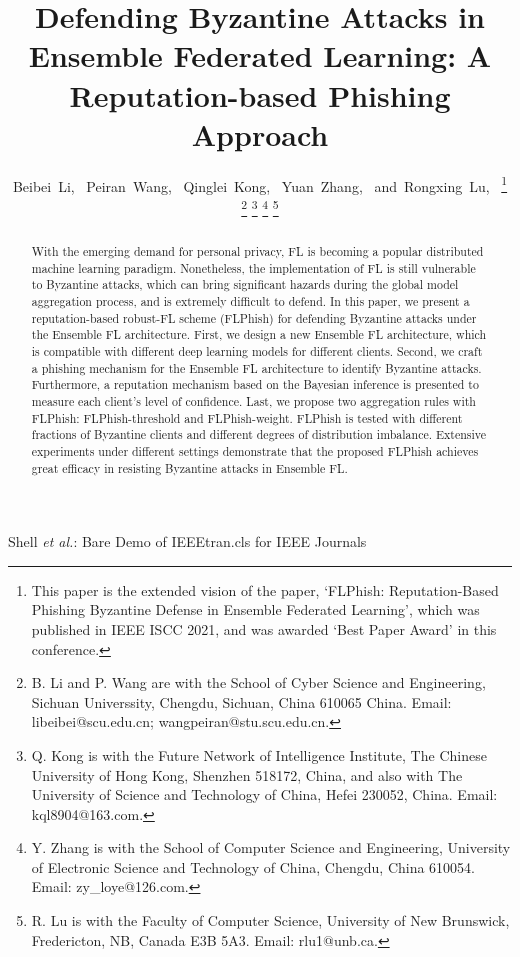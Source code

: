 \documentclass[journal]{IEEEtran}
\begin{document}
\title{Defending Byzantine Attacks in Ensemble Federated Learning: A Reputation-based Phishing Approach}


\author{Beibei~Li,~
        Peiran~Wang,~
        Qinglei~Kong,~
        Yuan~Zhang,~
        and~Rongxing~Lu,~
\thanks{This paper is the extended vision of the paper, `FLPhish: Reputation-Based Phishing Byzantine Defense in Ensemble Federated Learning', which was published in IEEE ISCC 2021, and was awarded `Best Paper Award' in this conference.}
\thanks{B. Li and P. Wang are with the School of Cyber Science and Engineering, Sichuan Universsity, Chengdu, Sichuan, China 610065 China. Email: libeibei@scu.edu.cn; wangpeiran@stu.scu.edu.cn.}
\thanks{Q. Kong is with the Future Network of Intelligence Institute, The Chinese University of Hong Kong, Shenzhen 518172, China, and also with The University of Science and Technology of China, Hefei 230052, China. Email: kql8904@163.com.}
\thanks{Y. Zhang is with the School of Computer Science and Engineering, University of Electronic Science and Technology of China, Chengdu, China 610054. Email: zy\_loye@126.com.}
\thanks{R. Lu is with the Faculty of Computer Science, University of New Brunswick, Fredericton, NB, Canada E3B 5A3. Email: rlu1@unb.ca.}
}



%
{Shell \MakeLowercase{\textit{et al.}}: Bare Demo of IEEEtran.cls for IEEE Journals}

\maketitle
\begin{abstract}
  With the emerging demand for personal privacy, FL is becoming a popular distributed machine learning paradigm. Nonetheless, the implementation of FL is still vulnerable to Byzantine attacks, which can bring significant hazards during the global model aggregation process, and is extremely difficult to defend. In this paper, we present a reputation-based robust-FL scheme (FLPhish) for defending Byzantine attacks under the Ensemble FL architecture. First, we design a new Ensemble FL architecture, which is compatible with different deep learning models for different clients. Second, we craft a phishing mechanism for the Ensemble FL architecture to identify Byzantine attacks. Furthermore, a reputation mechanism based on the Bayesian inference is presented to measure each client's level of confidence. Last, we propose two aggregation rules with FLPhish: FLPhish-threshold and FLPhish-weight. FLPhish is tested with different fractions of Byzantine clients and different degrees of distribution imbalance. Extensive experiments under different settings demonstrate that the proposed FLPhish achieves great efficacy in resisting Byzantine attacks in Ensemble FL.
\end{abstract}
\end{document}

